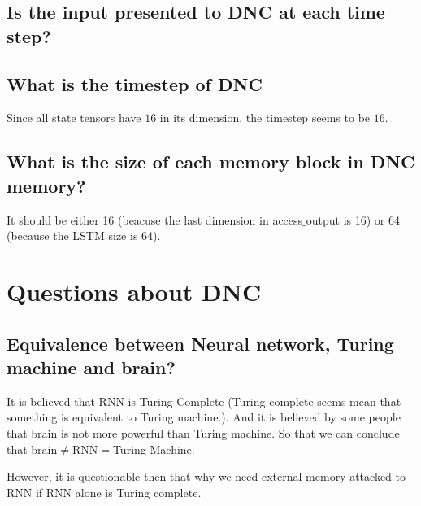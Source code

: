 \documentclass{article}
\begin{document}
\subsection{Is the input presented to DNC at each time step?}

\subsection{What is the timestep of DNC}
Since all state tensors have $16$ in its dimension, the timestep seems to be $16$.

\subsection{What is the size of each memory block in DNC memory?}
It should be either 16 (beacuse the last dimension in access$\_$output is 16) or 64 (because the LSTM size is 64).

\section{Questions about DNC}
\subsection{Equivalence between Neural network, Turing machine and brain?}
It is believed that RNN is Turing Complete (Turing complete seems mean that something is equivalent to Turing machine.). And it is believed by some people that brain is not more powerful than Turing machine. So that we can conclude that brain$\neq$RNN$=$Turing Machine.

However, it is questionable then that why we need external memory attacked to RNN if RNN alone is Turing complete.
\end{document}
